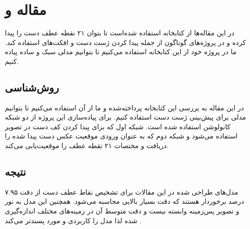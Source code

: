 \section{مقاله  و }
در این مقاله‌ها از کتابخانه  استفاده‌ شده‌است تا بتوان ۲۱ نقطه عطف دست را پیدا کرده و در پروژه‌های گوناگون از جمله پیدا کردن ژست دست و افکت‌های  استفاده کند. ما در پروژه خود از این کتابخانه استفاده می‌کنیم تا بتوانیم مدلی سبک و ساده پیاده کنیم.

\subsection{روش‌شناسی}
 در این مقاله به یررسی این کتابخانه پرداخته‌شده و ما از آن استفاده می‌کنیم تا بتوانیم مدلی برای پیش‌بینی ژست دست استفاده کنیم.
برای پیاده‌سازی این پروژه از دو شبکه کانولوشن استفاده شده است. شبکه اول که برای پیدا کردن کف دست در تصویر استفاده می‌شود و شبکه دوم که به عنوان ورودی موقعیت عکس دست پیدا شده را دریافت و مختصات ۲۱ تقطه عطف را موقعیت‌یابی می‌کند.






\subsection{نتیجه}
مدل‌های طراحی شده در این مقالات برای تشخیص نقاط عطف دست از دقت ۷.۹۵ درصد برخوردار هستند که دقت بسیار بالایی محاسبه می‌شود. همچنین این مدل به نور و تصویر پس‌زمینه وابسته نیست و دقت متوسط آن در زمینه‌های مختلف اندازه‌گیری شده لذا مدل را کاربردی‌ و مورد پسندتر می‌کند\cite{zhang2020mediapipe} \cite{harris2021applying}.



